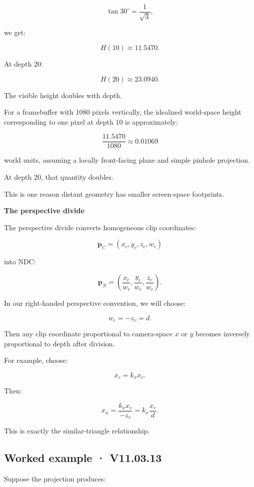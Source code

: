 \[
 \tan30^\circ=\frac1{\sqrt3},
\]

we get:

\[
 \boxed{ H(10)\approx11.5470 }.
\]

At depth 20:

\[
 H(20)\approx23.0940.
\]

The visible height doubles with depth.

For a framebuffer with 1080 pixels vertically, the idealized world-space height corresponding to one pixel at depth 10 is approximately:

\[
 \frac{11.5470}{1080}\approx0.01069
\]

world units, assuming a locally front-facing plane and simple pinhole projection.

At depth 20, that quantity doubles.

This is one reason distant geometry has smaller screen-space footprints.

\textbf{The perspective divide}

The perspective divide converts homogeneous clip coordinates:

\[
 \mathbf p_C= (x_c,y_c,z_c,w_c)
\]

into NDC:

\[
 \boxed{ \mathbf p_N= \left( \frac{x_c}{w_c}, \frac{y_c}{w_c}, \frac{z_c}{w_c} \right) }.
\]

In our right-handed perspective convention, we will choose:

\[
 \boxed{ w_c=-z_v=d }.
\]

Then any clip coordinate proportional to camera-space \(x\) or \(y\) becomes inversely proportional to depth after division.

For example, choose:

\[
 x_c=k_xx_v.
\]

Then:

\[
 x_n= \frac{k_xx_v}{-z_v} = k_x\frac{x_v}{d}.
\]

This is exactly the similar-triangle relationship.

\begin{allmightroleexample}

\subsection{Worked example · V11.03.13}\label{02-foundations-ii-ch033-worked-example-v11.03.13}

\hypertarget{02-foundations-ii-ch033-worked-example-v11.03.13}{}

Suppose the projection produces:

\end{allmightroleexample}

